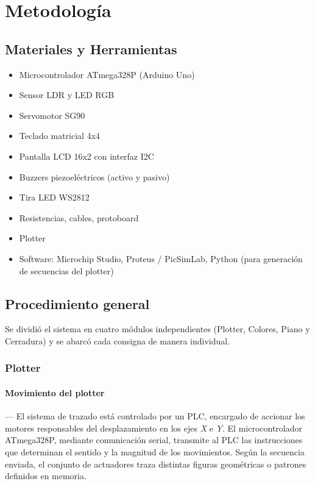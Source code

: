 \section{Metodología}

\subsection{Materiales y Herramientas}

\begin{itemize}
    \item Microcontrolador ATmega328P (Arduino Uno)
    \item Sensor LDR y LED RGB
    \item Servomotor SG90
    \item Teclado matricial 4x4
    \item Pantalla LCD 16x2 con interfaz I2C
    \item Buzzers piezoeléctricos (activo y pasivo)
    \item Tira LED WS2812
    \item Resistencias, cables, protoboard
    \item Plotter 
    \item Software: Microchip Studio, Proteus / PicSimLab, Python (para generación de secuencias del plotter)
\end{itemize}

\subsection{Procedimiento general}
Se dividió el sistema en cuatro módulos independientes (Plotter, Colores, Piano y Cerradura) y se abarcó cada consigna de manera individual.

\subsubsection{\textbf{Plotter}}
    \paragraph*{\textbf{Movimiento del plotter}}---
    El sistema de trazado está controlado por un PLC, encargado de accionar los motores responsables del desplazamiento en los ejes \textit{X} e \textit{Y}. El microcontrolador ATmega328P, mediante comunicación serial, transmite al PLC las instrucciones que determinan el sentido y la magnitud de los movimientos. Según la secuencia enviada, el conjunto de actuadores traza distintas figuras geométricas o patrones definidos en memoria.

